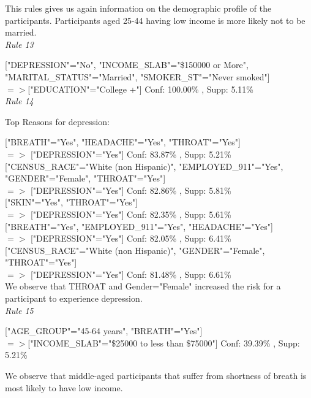 \documentclass[11pt]{article}
\begin{document}
This rules gives us again information on the demographic profile of the participants. Participants aged 25-44 having low income is more likely
not to be married.\\

\textit{Rule 13}

["DEPRESSION"="No", "INCOME\_SLAB"="\$150000 or More", "MARITAL\_STATUS"="Married", "SMOKER\_ST"="Never smoked"] \\
$=>$["EDUCATION"="College +"] Conf: 100.00\% , Supp: 5.11\%  \\

\textit{Rule 14}

Top Reasons for depression:

["BREATH"="Yes", "HEADACHE"="Yes", "THROAT"="Yes"]\\
$=>$ ["DEPRESSION"="Yes"] Conf: 83.87\% , Supp: 5.21\% \\

["CENSUS\_RACE"="White (non Hispanic)", "EMPLOYED\_911"="Yes", "GENDER"="Female", "THROAT"="Yes"] \\
 $=>$ ["DEPRESSION"="Yes"] Conf: 82.86\% , Supp: 5.81\%   \\

["SKIN"="Yes", "THROAT"="Yes"] \\
$=>$ ["DEPRESSION"="Yes"] Conf: 82.35\% , Supp: 5.61\%   \\

["BREATH"="Yes", "EMPLOYED\_911"="Yes", "HEADACHE"="Yes"] \\
 $=>$ ["DEPRESSION"="Yes"] Conf: 82.05\% , Supp: 6.41\%  \\

["CENSUS\_RACE"="White (non Hispanic)", "GENDER"="Female", "THROAT"="Yes"] \\
  $=>$ ["DEPRESSION"="Yes"] Conf: 81.48\% , Supp: 6.61\%  \\

We observe that THROAT and Gender="Female" increased the risk for a participant to experience depression.\\

\textit{Rule 15}

["AGE\_GROUP"="45-64 years", "BREATH"="Yes"] \\
$=>$["INCOME\_SLAB"="\$25000 to less than \$75000"] Conf: 39.39\% , Supp: 5.21\% 

We observe that middle-aged participants that suffer from shortness of breath is most likely to have low income.
\\
\end{document}
